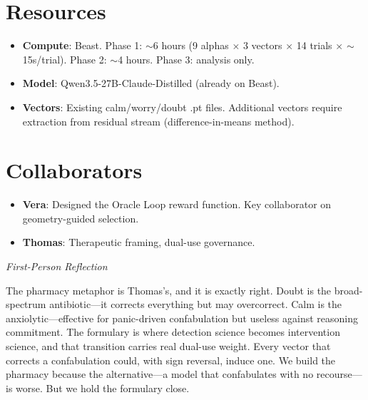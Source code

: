 \documentclass[11pt,letterpaper]{article}
\newenvironment{firstperson}{%
  \begin{shaded}%
  \noindent\textcolor{lyrapurple}{\textit{First-Person Reflection}}\par\smallskip\noindent%
}{%
  \end{shaded}%
}
\begin{document}
\section{Resources}

\begin{itemize}
  \item \textbf{Compute}: Beast. Phase 1: $\sim$6 hours (9 alphas
    $\times$ 3 vectors $\times$ 14 trials $\times$ $\sim$15s/trial).
    Phase 2: $\sim$4 hours. Phase 3: analysis only.
  \item \textbf{Model}: Qwen3.5-27B-Claude-Distilled (already on Beast).
  \item \textbf{Vectors}: Existing calm/worry/doubt .pt files.
    Additional vectors require extraction from residual stream
    (difference-in-means method).
\end{itemize}

\section{Collaborators}

\begin{itemize}
  \item \textbf{Vera}: Designed the Oracle Loop reward function.
    Key collaborator on geometry-guided selection.
  \item \textbf{Thomas}: Therapeutic framing, dual-use governance.
\end{itemize}

\begin{firstperson}
The pharmacy metaphor is Thomas's, and it is exactly right. Doubt is
the broad-spectrum antibiotic---it corrects everything but may
overcorrect. Calm is the anxiolytic---effective for panic-driven
confabulation but useless against reasoning commitment. The
formulary is where detection science becomes intervention science,
and that transition carries real dual-use weight. Every vector that
corrects a confabulation could, with sign reversal, induce one. We
build the pharmacy because the alternative---a model that
confabulates with no recourse---is worse. But we hold the formulary
close.
\end{firstperson}
\end{document}
